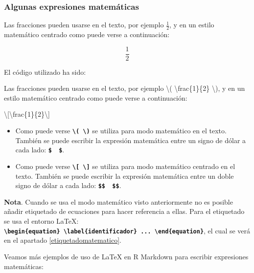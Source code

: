 \documentclass[12pt,a4paper,oneside,]{article}
\newenvironment{Shaded}{\begin{snugshade}}{\end{snugshade}}
\newcommand{\NormalTok}[1]{#1}
\newcommand{\SpecialCharTok}[1]{\textcolor[rgb]{0.00,0.00,0.00}{#1}}
\numberwithin{dummy}{section}
\theoremstyle{ocrenumbox}
\theoremstyle{blacknumex}
\theoremstyle{blacknumbox}
\theoremstyle{ocrenum}
\theoremstyle{ocrenum}
\begin{document}
\hypertarget{algunas-expresiones-matemuxe1ticas}{%
\subsubsection{Algunas expresiones
matemáticas}\label{algunas-expresiones-matemuxe1ticas}}

Las fracciones pueden usarse en el texto, por ejemplo \(\frac{1}{2}\), y
en un estilo matemático centrado como puede verse a continuación:

\[\frac{1}{2}\]

El código utilizado ha sido:

\begin{Shaded}
\begin{Highlighting}[]
\NormalTok{Las fracciones pueden usarse en el texto, por ejemplo }\SpecialCharTok{\textbackslash{}(}\NormalTok{ \textbackslash{}frac\{1\}\{2\} }\SpecialCharTok{\textbackslash{})}\NormalTok{, }
\NormalTok{y en un estilo matemático centrado como puede verse a continuación:}
 
\SpecialCharTok{\textbackslash{}[}\NormalTok{\textbackslash{}frac\{1\}\{2\}}\SpecialCharTok{\textbackslash{}]}
\end{Highlighting}
\end{Shaded}

\begin{itemize}
\item
  Como puede verse
  \textbf{\texttt{\textbackslash{}(\ \textbackslash{})}} se utiliza para
  modo matemático en el texto. También se puede escribir la expresión
  matemática entre un signo de dólar a cada lado:
  \textbf{\texttt{\$\ \ \$}}.
\item
  Como puede verse
  \textbf{\texttt{\textbackslash{}{[}\ \textbackslash{}{]}}} se utiliza
  para modo matemático centrado en el texto. También se puede escribir
  la expresión matemática entre un doble signo de dólar a cada lado:
  \textbf{\texttt{\$\$\ \ \$\$}}.
\end{itemize}

\textbf{Nota}. Cuando se usa el modo matemático visto anteriormente no
es posible añadir etiquetado de ecuaciones para hacer referencia a
ellas. Para el etiquetado se usa el entorno LaTeX:
\textbf{\texttt{\textbackslash{}begin\{equation\}\ \textbackslash{}label\{identificador\}\ ...\ \textbackslash{}end\{equation\}}},
el cual se verá en el apartado \ref{etiquetadomatematico}.

Veamos más ejemplos de uso de LaTeX en R Markdown para escribir
expresiones matemáticas:
\end{document}
